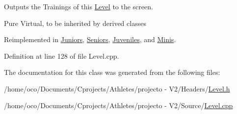 Outputs the Trainings of this \hyperlink{class_level}{Level} to the screen. 

Pure Virtual, to be inherited by derived classes 

Reimplemented in \hyperlink{class_juniors_ad74d069390fffeda607de3584a0453de}{Juniors}, \hyperlink{class_seniors_a1f993a8ff143cc2e6dee8f3c81ed4cf3}{Seniors}, \hyperlink{class_juveniles_a168139683f59bca317a7d55cd33be5ac}{Juveniles}, and \hyperlink{class_minis_a69059ad5f89289c70ce6dec4906e02f3}{Minis}.



Definition at line 128 of file Level.\+cpp.



The documentation for this class was generated from the following files\+:\begin{DoxyCompactItemize}
\item 
/home/oco/\+Documents/\+Cprojects/\+Athletes/projecto -\/ V2/\+Headers/\hyperlink{_level_8h}{Level.\+h}\item 
/home/oco/\+Documents/\+Cprojects/\+Athletes/projecto -\/ V2/\+Source/\hyperlink{_level_8cpp}{Level.\+cpp}\end{DoxyCompactItemize}
